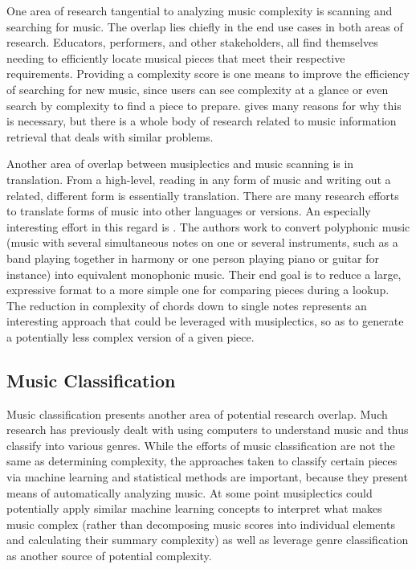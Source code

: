 \documentclass[10pt,preprint]{sigplanconf}
\begin{document}
One area of research tangential to analyzing music complexity is scanning and searching for music. The overlap lies chiefly in the end use cases in both areas of research. Educators, performers, and other stakeholders, all find themselves needing to efficiently locate musical pieces that meet their respective requirements. Providing a complexity score is one means to improve the efficiency of searching for new music, since users can see complexity at a glance or even search by complexity to find a piece to prepare. \cite{Byrd2001} gives many reasons for why this is necessary, but there is a whole body of research related to music information retrieval that deals with similar problems.

Another area of overlap between musiplectics and music scanning is in translation. From a high-level, reading in any form of music and writing out a related, different form is essentially translation. There are many research efforts to translate forms of music into other languages or versions. An especially interesting effort in this regard is \cite{Allali2009}. The authors work to convert polyphonic music (music with several simultaneous notes on one or several instruments, such as a band playing together in harmony or one person playing piano or guitar for instance) into equivalent monophonic music. Their end goal is to reduce a large, expressive format to a more simple one for comparing pieces during a lookup. The reduction in complexity of chords down to single notes represents an interesting approach that could be leveraged with musiplectics, so as to generate a potentially less complex version of a given piece.

\subsection{Music Classification}
\label{sec:relclass}

Music classification presents another area of potential research overlap. Much research has previously dealt with using computers to understand music and thus classify into various genres. While the efforts of music classification are not the same as determining complexity, the approaches taken to classify certain pieces via machine learning and statistical methods are important, because they present means of automatically analyzing music. At some point musiplectics could potentially apply similar machine learning concepts to interpret what makes music complex  (rather than decomposing music scores into individual elements and calculating their summary complexity) as well as leverage genre classification as another source of potential complexity. 
\end{document}
